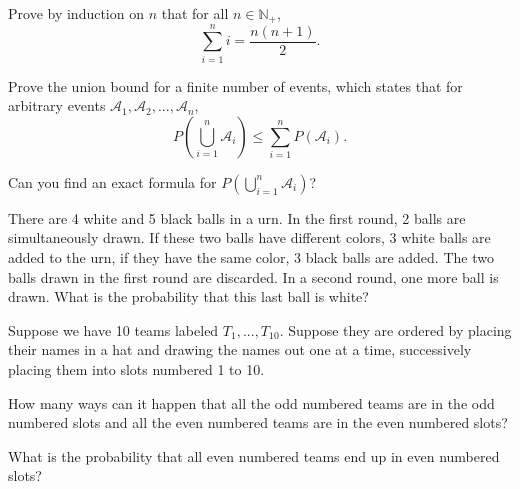 \documentclass[a4paper,10pt,landscape,twocolumn]{scrartcl}
\begin{document}
\begin{exercise}

	\begin{subex}
	Prove by induction on $n$ that for all $n \in \mathbb{N}_+$,
	\[
	\sum_{i=1}^n i = \frac{n(n+1)}{2}.
	\]
	\end{subex}
	
	\begin{subex}
	Prove the union bound for a finite number of events, which states that for arbitrary events $\mathcal{A}_1, \mathcal{A}_2, ..., \mathcal{A}_n$,
	\[
	P \left( \bigcup_{i=1}^n \mathcal{A}_i \right) \leq \sum_{i=1}^n P(\mathcal{A}_i).
	\]
	\end{subex}

	\begin{subex**}
	Can you find an exact formula for $P\left( \bigcup_{i=1}^n \mathcal{A}_i \right)$?
	\end{subex**}

\end{exercise}

\begin{exercise}
There are 4 white and 5 black balls in a urn. In the first round, 2
balls are simultaneously drawn. If these two balls have different
colors, 3 white balls are added to the urn, if they have the same
color, 3 black balls are added. The two balls drawn in the first round
are discarded. In a second round, one more ball is drawn. What is the
probability that this last ball is white?
\end{exercise}

\begin{exercise}
	Suppose we have 10 teams labeled $T_1, ..., T_{10}$. Suppose they are ordered by placing their names in a hat and drawing the names out one at a time, successively placing them into slots numbered 1 to 10.
	
	\begin{subex}
		How many ways can it happen that all the odd numbered teams are in the odd numbered slots and all the even numbered teams are in the even numbered slots?
	\end{subex}
	\begin{subex}
		What is the probability that all even numbered teams end up in even numbered slots?
	\end{subex}
\end{exercise}


\enlargethispage{1cm}
\end{document}
